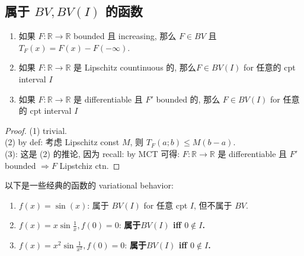\subsection{\texorpdfstring{属于 \(BV,BV(I)\) 的函数}{属于 BV,BV(I) 的函数}}\label{ux5c5eux4e8e-bvbvi-ux7684ux51fdux6570}

\begin{lemma}{}

\begin{enumerate}
\item
  如果 \(F:\mathbb{R}\rightarrow\mathbb{R}\) bounded 且 increasing, 那么 \(F \in BV\) 且 \(T_{F}(x) = F(x) - F( - \infty)\).\\
\item
  如果 \(F:\mathbb{R}\rightarrow\mathbb{R}\) 是 Lipschitz countinuous 的, 那么\(F \in BV(I)\) for 任意的 cpt interval \(I\)
\item
  如果 \(F:\mathbb{R}\rightarrow\mathbb{R}\) 是 differentiable 且 \(F'\) bounded 的, 那么 \(F \in BV(I)\) for 任意的 cpt interval \(I\)
\end{enumerate}

\end{lemma}

\begin{proof}

(1) trivial.\\
(2) by def: 考虑 Lipschitz const \(M\), 则 \(T_{F}(a;b) \leq M(b - a)\).\\
(3): 这是 (2) 的推论, 因为 recall: by MCT 可得: \(F:\mathbb{R}\rightarrow\mathbb{R}\) 是 differentiable 且 \(F'\) bounded \(\Longrightarrow F\) Lipstchiz ctn.

\end{proof}

\begin{proposition}

以下是一些经典的函数的 variational behavior:

\begin{enumerate}
\item
  \(f(x) = \sin(x)\): 属于 \(BV(I)\) for 任意 cpt \(I\), 但不属于 \(BV\).
\item
  \(f(x) = x\sin\frac{1}{x},f(0) = 0\): \textbf{属于\(BV(I)\) iff \(0 \notin I\).}
\item
  \(f(x) = x^{2}\sin\frac{1}{x^{2}},f(0) = 0\): \textbf{属于\(BV(I)\) iff \(0 \notin I\).}
\end{enumerate}

\end{proposition}

